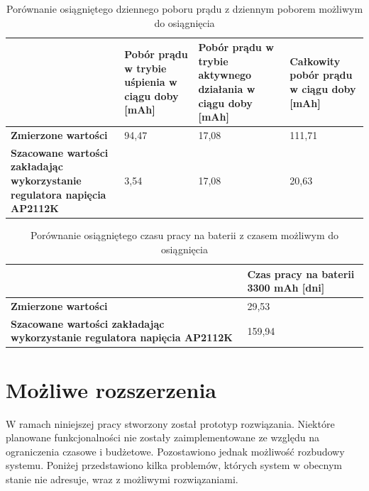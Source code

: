        \begin{table}[]
            \centering
            \caption{Porównanie osiągniętego dziennego poboru prądu z dziennym poborem możliwym do osiągnięcia}
            \begin{tabular}{p{4cm}|p{3cm}|p{3cm}|p{3cm} }
                    & \textbf{Pobór prądu w trybie uśpienia w ciągu doby [mAh]} & \textbf{Pobór prądu w trybie aktywnego działania w ciągu doby [mAh]} & \textbf{Całkowity pobór prądu w ciągu doby [mAh]} \\ \hline
             \textbf{Zmierzone wartości}
                      & 94,47 & 17,08 & 111,71 \\
            \hline
            \textbf{Szacowane wartości zakładając wykorzystanie regulatora napięcia AP2112K} &  3,54 & 17,08 & 20,63 \\
            \end{tabular}
            \label{tbl:tab2}
            \vspace{10mm}
        \end{table}

        \begin{table}[]
            \caption{Porównanie osiągniętego czasu pracy na baterii z czasem możliwym do osiągnięcia}
            \centering
            \begin{tabular}{p{}|p{}}
                    & \textbf{Czas pracy na baterii 3300 mAh [dni]} \\ \hline
             \textbf{Zmierzone wartości}
                      & 29,53 \\
            \hline
            \textbf{Szacowane wartości zakładając wykorzystanie regulatora napięcia AP2112K} &  159,94  \\
            \end{tabular}
            \label{tbl:tab3}
            \vspace{10mm}
        \end{table}

	\section{Możliwe rozszerzenia}

        W ramach niniejszej pracy stworzony został prototyp rozwiązania. Niektóre planowane funkcjonalności nie zostały zaimplementowane ze względu na ograniczenia czasowe i budżetowe. Pozostawiono jednak możliwość rozbudowy systemu. Poniżej przedstawiono kilka problemów, których system w obecnym stanie nie adresuje, wraz z możliwymi rozwiązaniami.

